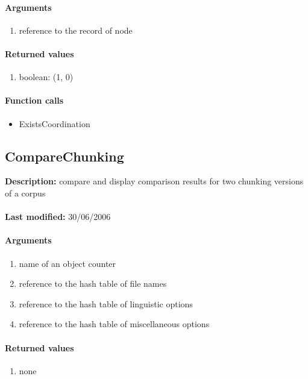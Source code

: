 \paragraph{Arguments}
\begin{enumerate}
\item reference to the record of node
\end{enumerate}

\paragraph{Returned values}
\begin{enumerate}
\item boolean: (1, 0)
\end{enumerate}

\paragraph{Function calls}
\begin{itemize}
\item ExistsCoordination
\end{itemize}

\subsection{CompareChunking}
\textbf{Description:} compare  and display comparison results for two chunking versions of a corpus\\
\\\textbf{Last modified:} 30/06/2006

\paragraph{Arguments}
\begin{enumerate}
\item name of an object counter
\item reference to the hash table of file names
\item reference to the hash table of linguistic options
\item reference to the hash table of miscellaneous options
\end{enumerate}

\paragraph{Returned values}
\begin{enumerate}
\item none
\end{enumerate}

